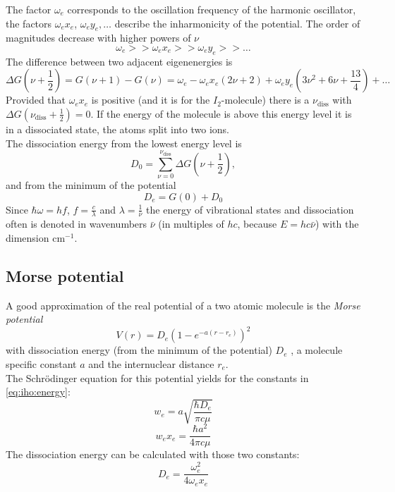 The factor $\omega_e$ corresponds to the oscillation frequency of the harmonic oscillator, the factors $\omega_e x_e$, $\omega_e y_e, \ldots$ 
describe the inharmonicity of the potential. The order of magnitudes decrease with higher powers of $\nu$
\begin{equation}
  \omega_e >> \omega_e x_e >> \omega_e y_e >> \ldots
\end{equation}
The difference between two adjacent eigenenergies is
\begin{equation}
\label{eq:iho:energydiff}
  \Delta G \left( \nu + \frac{1}{2} \right) = G(\nu + 1) - G(\nu) = \omega_e - \omega_e x_e (2\nu + 2) + \omega_e y_e \left( 3\nu^2 + 6 \nu + \frac{13}{4} \right) + \ldots 
\end{equation}
Provided that $\omega_e x_e$ is positive (and it is for the $I_2$-molecule) there is a 
$\nu_{\text{diss}}$ with ${\Delta G (\nu_{\text{diss}} + \frac{1}{2}) = 0}$. If the energy of the molecule is above this energy level it 
is in a dissociated state, the atoms split into two ions. \\
The dissociation energy from the lowest energy level is
\begin{equation}
\label{eq:dissenergy}
  D_0 = \sum_{\nu=0}^{\nu_{\text{diss}}} \Delta G \left( \nu + \frac{1}{2} \right),
\end{equation}
and from the minimum of the potential
\begin{equation}
  \label{eq:dissenergy2}
  D_e = G(0) + D_0
\end{equation} 
Since $\hbar \omega = h f$, $f = \frac{c}{\lambda}$ and $\lambda = \frac{1}{\bar{\nu}}$ the energy of vibrational states and dissociation often 
is denoted in wavenumbers $\bar{\nu}$ 
(in multiples of $h c$, because $E = hc\bar{\nu}$) with the dimension $\text{cm}^{-1}$.

\subsection{Morse potential}
A good approximation of the real potential of a two atomic molecule is the \emph{Morse potential}
\begin{equation}
\label{eq:morse}
  V(r) = D_e \left( 1 - e^{-a(r-r_e)} \right)^2
\end{equation}
with dissociation energy (from the minimum of the potential) $D_e$	, a molecule specific constant $a$  and the internuclear distance $r_e$. \\
The Schrödinger equation for this potential yields for the constants in \autoref{eq:iho:energy}:
\begin{equation}
\label{eq:morse_we}
  w_e = a \sqrt{\frac{\hbar D_e}{\pi c \mu}}
\end{equation}
\begin{equation}
\label{eq:morse_wexe}
  w_e x_e = \frac{\hbar a^2}{4 \pi c \mu}
\end{equation}
The dissociation energy can be calculated with those two constants:
\begin{equation}
\label{eq:morse_dissenergy}
  D_e = \frac{\omega_e^2}{4 \omega_e x_e}
\end{equation}

